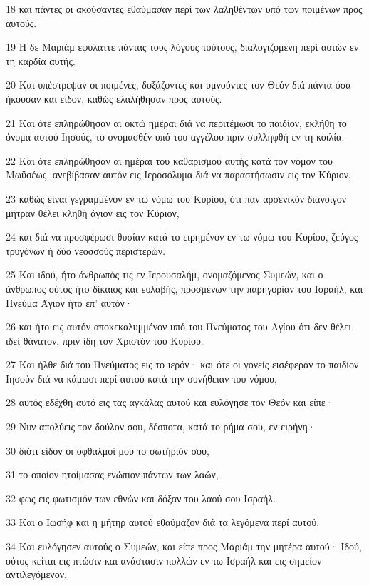 \par 18 και πάντες οι ακούσαντες εθαύμασαν περί των λαληθέντων υπό των ποιμένων προς αυτούς.
\par 19 Η δε Μαριάμ εφύλαττε πάντας τους λόγους τούτους, διαλογιζομένη περί αυτών εν τη καρδία αυτής.
\par 20 Και υπέστρεψαν οι ποιμένες, δοξάζοντες και υμνούντες τον Θεόν διά πάντα όσα ήκουσαν και είδον, καθώς ελαλήθησαν προς αυτούς.
\par 21 Και ότε επληρώθησαν αι οκτώ ημέραι διά να περιτέμωσι το παιδίον, εκλήθη το όνομα αυτού Ιησούς, το ονομασθέν υπό του αγγέλου πριν συλληφθή εν τη κοιλία.
\par 22 Και ότε επληρώθησαν αι ημέραι του καθαρισμού αυτής κατά τον νόμον του Μωϋσέως, ανεβίβασαν αυτόν εις Ιεροσόλυμα διά να παραστήσωσιν εις τον Κύριον,
\par 23 καθώς είναι γεγραμμένον εν τω νόμω του Κυρίου, ότι παν αρσενικόν διανοίγον μήτραν θέλει κληθή άγιον εις τον Κύριον,
\par 24 και διά να προσφέρωσι θυσίαν κατά το ειρημένον εν τω νόμω του Κυρίου, ζεύγος τρυγόνων ή δύο νεοσσούς περιστερών.
\par 25 Και ιδού, ήτο άνθρωπός τις εν Ιερουσαλήμ, ονομαζόμενος Συμεών, και ο άνθρωπος ούτος ήτο δίκαιος και ευλαβής, προσμένων την παρηγορίαν του Ισραήλ, και Πνεύμα Άγιον ήτο επ' αυτόν·
\par 26 και ήτο εις αυτόν αποκεκαλυμμένον υπό του Πνεύματος του Αγίου ότι δεν θέλει ιδεί θάνατον, πριν ίδη τον Χριστόν του Κυρίου.
\par 27 Και ήλθε διά του Πνεύματος εις το ιερόν· και ότε οι γονείς εισέφεραν το παιδίον Ιησούν διά να κάμωσι περί αυτού κατά την συνήθειαν του νόμου,
\par 28 αυτός εδέχθη αυτό εις τας αγκάλας αυτού και ευλόγησε τον Θεόν και είπε·
\par 29 Νυν απολύεις τον δούλον σου, δέσποτα, κατά το ρήμα σου, εν ειρήνη·
\par 30 διότι είδον οι οφθαλμοί μου το σωτήριόν σου,
\par 31 το οποίον ητοίμασας ενώπιον πάντων των λαών,
\par 32 φως εις φωτισμόν των εθνών και δόξαν του λαού σου Ισραήλ.
\par 33 Και ο Ιωσήφ και η μήτηρ αυτού εθαύμαζον διά τα λεγόμενα περί αυτού.
\par 34 Και ευλόγησεν αυτούς ο Συμεών, και είπε προς Μαριάμ την μητέρα αυτού· Ιδού, ούτος κείται εις πτώσιν και ανάστασιν πολλών εν τω Ισραήλ και εις σημείον αντιλεγόμενον.
